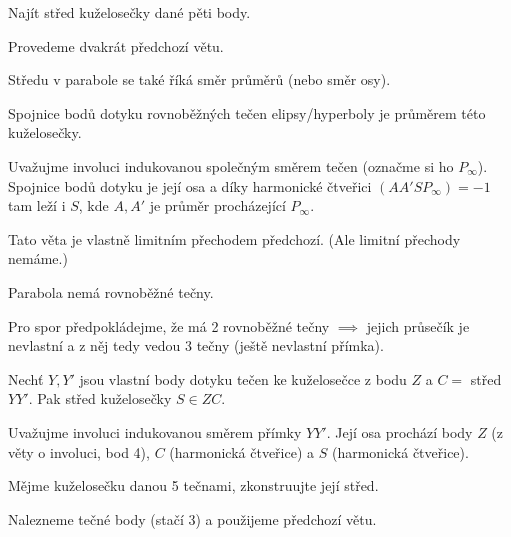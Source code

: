 \documentclass[12pt]{article}					%
\begin{document}
\begin{priklad}[Konstrukce]
	Najít střed kuželosečky dané pěti body.

	\begin{reseni}
		Provedeme dvakrát předchozí větu.
	\end{reseni}
\end{priklad}


\begin{poznamka}
	Středu v parabole se také říká směr průměrů (nebo směr osy).
\end{poznamka}

\begin{veta}
	Spojnice bodů dotyku rovnoběžných tečen elipsy/hyperboly je průměrem této kuželosečky.

	\begin{dukazin}
		Uvažujme involuci indukovanou společným směrem tečen (označme si ho $P_∞$). Spojnice bodů dotyku je její osa a díky harmonické čtveřici $(AA'SP_∞) = -1$ tam leží i $S$, kde $A, A'$ je  průměr procházející $P_∞$.
	\end{dukazin}

	\begin{poznamkain}
		Tato věta je vlastně limitním přechodem předchozí. (Ale limitní přechody nemáme.)
	\end{poznamkain}
\end{veta}

\begin{upozorneni}
	Parabola nemá rovnoběžné tečny.

	\begin{dukazin}
		Pro spor předpokládejme, že má 2 rovnoběžné tečny $\implies$ jejich průsečík je nevlastní a z něj tedy vedou 3 tečny (ještě nevlastní přímka).
	\end{dukazin}
\end{upozorneni}

\begin{veta}
	Nechť $Y, Y'$ jsou vlastní body dotyku tečen ke kuželosečce z bodu $Z$ a $C = $ střed $YY'$. Pak střed kuželosečky $S \in ZC$.

	\begin{dukazin}
		Uvažujme involuci indukovanou směrem přímky $YY'$. Její osa prochází body $Z$ (z věty o involuci, bod 4), $C$ (harmonická čtveřice) a $S$ (harmonická čtveřice).
	\end{dukazin}
\end{veta}

\begin{priklad}
	Mějme kuželosečku danou 5 tečnami, zkonstruujte její střed.

	\begin{reseni}
		Nalezneme tečné body (stačí 3) a použijeme předchozí větu.
	\end{reseni}
\end{priklad}
\end{document}
